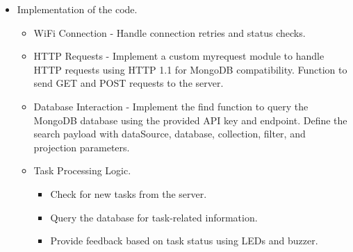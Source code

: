 \documentclass[12pt,a4paper]{report}
\begin{document}
\begin{enumerate}
\begin{itemize}
\begin{itemize}
				\end{itemize}
			\item Implementation of the code.
				\begin{itemize}
					\item WiFi Connection - Handle connection retries and status checks.
					\item HTTP Requests - Implement a custom myrequest module to handle HTTP requests using HTTP 1.1 for MongoDB compatibility. Function to send GET and POST requests to the server.
					\item Database Interaction - Implement the find function to query the MongoDB database using the provided API key and endpoint. Define the search payload with dataSource, database, collection, filter, and projection parameters.
					\item Task Processing Logic.
						\begin{itemize}
							\item Check for new tasks from the server.
							\item Query the database for task-related information.
							\item Provide feedback based on task status using LEDs and buzzer.
						\end{itemize}
				\end{itemize}
		\end{itemize}

		
\end{enumerate}
\end{document}
